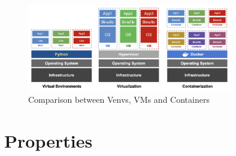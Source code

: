 \begin{figure}[H]
    \centering
    \includegraphics[width=0.8\textwidth]{assets/fig34.png}
    \caption{Comparison between Venvs, VMs and Containers}
\end{figure}

\section{Properties}

